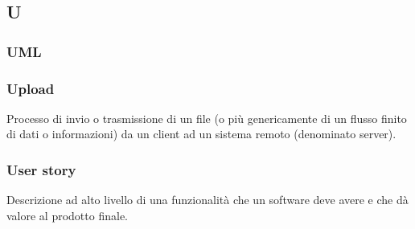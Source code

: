 \subsection*{\textbf{\hfill \Huge{U} \hfill}} 
\subsubsection*{UML}

\subsubsection*{Upload}
Processo di invio o trasmissione di un file (o più genericamente di un flusso finito di dati o informazioni) da un client ad un sistema remoto (denominato server).
\subsubsection*{User story}
Descrizione ad alto livello di una funzionalità che un software deve avere e che dà valore al prodotto finale.

